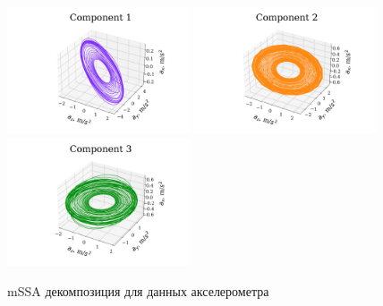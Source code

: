			\begin{figure}[h]
				\centering
				\includegraphics[width=0.48\textwidth, keepaspectratio]{../experiments/motion_1/mssa/figs/decomposition/manual/grouping_2/acceler_1.png}
				\includegraphics[width=0.48\textwidth, keepaspectratio]{../experiments/motion_1/mssa/figs/decomposition/manual/grouping_2/acceler_2.png}
				\includegraphics[width=0.48\textwidth, keepaspectratio]{../experiments/motion_1/mssa/figs/decomposition/manual/grouping_2/acceler_3.png}
				\caption{mSSA декомпозиция для данных акселерометра}\label{fig:accel_decomp_mssa}
			\end{figure}
			
